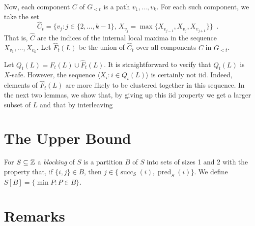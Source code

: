 \documentclass{patmorin}
\DeclareMathOperator{\cw}{succ}
\DeclareMathOperator{\ccw}{pred}
\begin{document}
Now, each component $C$ of $G_{<t}$ is a path $v_1,\ldots,v_k$.  For each
such component, we take the set 
\[ 
    \hat{C}_t=\{v_j : j\in\{2,\ldots,k-1\},\, X_{v_j}=\max\{X_{v_{j-1}},X_{v_j},X_{v_{j+1}}\}\} \enspace .
\]
That is, $\hat{C}$ are the indices of the internal local maxima in the
sequence $X_{v_1},\ldots,X_{v_k}$.  Let $\hat{F}_t(L)$ be the union of
$\hat{C}_t$ over all components $C$ in $G_{<t}$.

Let $Q_t(L)= F_t(L)\cup \hat{F}_t(L)$. It is straightforward to verify
that $Q_t(L)$ is $X$-safe.  However, the sequence $\langle X_i: i\in
Q_t(L)\rangle$ is certainly not iid.  Indeed, elements of $\hat{F}_t(L)$
are more likely to be clustered together in this sequence.
In the next two lemmas, we show that, by giving up this iid property we get a larger subset of $L$ and that by interleaving 

\begin{lem}

\end{lem}




\section{The Upper Bound}

For $S\subseteq\mathbb{Z}$ a \emph{blocking} of $S$ is a partition $B$ of $S$
into sets of sizes 1 and 2 with the property that, if $\{i,j\}\in B$, then
$j\in\{\cw_S(i),\ccw_S(i)\}$.  We define $S[B] = \{\min P : P\in B\}$.  


\section{Remarks}



\end{document}
